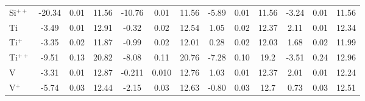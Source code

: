 \begin{longtable}{l!{\vrule width 0.25pt}ccc!{\vrule width 0.25pt}ccc!{\vrule width 0.25pt}ccc!{\vrule width 0.25pt}ccc}
Si$^{++}$ & -20.34 & 0.01 & 11.56 & -10.76 & 0.01 & 11.56 & -5.89 & 0.01 & 11.56 & -3.24 & 0.01 & 11.56 \\
Ti & -3.49 & 0.01 & 12.91 & -0.32 & 0.02 & 12.54 & 1.05 & 0.02 & 12.37 & 2.11 & 0.01 & 12.34 \\
Ti$^+$ & -3.35 & 0.02 & 11.87 & -0.99 & 0.02 & 12.01 & 0.28 & 0.02 & 12.03 & 1.68 & 0.02 & 11.99 \\
Ti$^{++}$ & -9.51 & 0.13 & 20.82 & -8.08 & 0.11 & 20.76 & -7.28 & 0.10 & 19.2 & -3.51 & 0.24 & 12.96 \\
V & -3.31 & 0.01 & 12.87 & -0.211 & 0.010 & 12.76 & 1.03 & 0.01 & 12.37 & 2.01 & 0.01 & 12.24 \\
V$^+$ & -5.74 & 0.03 & 12.44 & -2.15 & 0.03 & 12.63 & -0.80 & 0.03 & 12.7 & 0.73 & 0.03 & 12.51 \\
\end{longtable}


